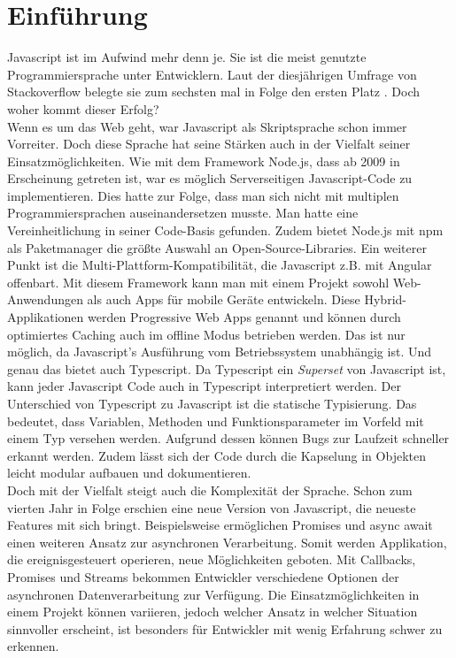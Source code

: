 \setcounter{secnumdepth}{1}

\section{Einführung}

Javascript ist im Aufwind mehr denn je. Sie ist die meist genutzte Programmiersprache unter Entwicklern. Laut der diesjährigen Umfrage von Stackoverflow belegte sie zum sechsten mal in Folge den ersten Platz \cite{programming-language-survey}. Doch woher kommt dieser Erfolg? \\

\noindent
Wenn es um das Web geht, war Javascript als Skriptsprache schon immer Vorreiter. Doch diese Sprache hat seine Stärken auch in der Vielfalt seiner Einsatzmöglichkeiten. Wie mit dem Framework Node.js, dass ab 2009 in Erscheinung getreten ist, war es möglich Serverseitigen Javascript-Code zu implementieren. Dies hatte zur Folge, dass man sich nicht mit multiplen Programmiersprachen auseinandersetzen musste. Man hatte eine Vereinheitlichung in seiner Code-Basis gefunden. Zudem bietet Node.js mit npm als Paketmanager die größte Auswahl an Open-Source-Libraries. Ein weiterer Punkt ist die Multi-Plattform-Kompatibilität, die Javascript z.B. mit Angular offenbart. Mit diesem Framework kann man mit einem Projekt sowohl Web-Anwendungen als auch Apps für mobile Geräte entwickeln. Diese Hybrid-Applikationen werden Progressive Web Apps genannt und können durch optimiertes Caching auch im offline Modus betrieben werden. Das ist nur möglich, da Javascript's Ausführung vom Betriebssystem unabhängig ist. Und genau das bietet auch Typescript. Da Typescript ein \textit{Superset} von Javascript ist, kann jeder Javascript Code auch in Typescript interpretiert werden. Der Unterschied von Typescript zu Javascript ist die statische Typisierung. Das bedeutet, dass Variablen, Methoden und Funktionsparameter im Vorfeld mit einem Typ versehen werden. Aufgrund dessen können Bugs zur Laufzeit schneller erkannt werden. Zudem lässt sich der Code durch die Kapselung in Objekten leicht modular aufbauen und dokumentieren.\\

\noindent
Doch mit der Vielfalt steigt auch die Komplexität der Sprache. Schon zum vierten Jahr in Folge erschien eine neue Version von Javascript, die neueste Features mit sich bringt. Beispielsweise ermöglichen Promises und async await einen weiteren Ansatz zur asynchronen Verarbeitung. Somit werden Applikation, die ereignisgesteuert operieren, neue Möglichkeiten geboten. Mit Callbacks, Promises und Streams bekommen Entwickler verschiedene Optionen der asynchronen Datenverarbeitung zur Verfügung. Die Einsatzmöglichkeiten in einem Projekt können variieren, jedoch welcher Ansatz in welcher Situation sinnvoller erscheint, ist besonders für Entwickler mit wenig Erfahrung schwer zu erkennen.

